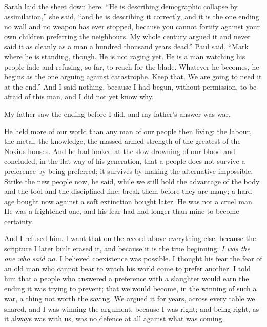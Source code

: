 \ornament

Sarah laid the sheet down here. ``He is describing demographic collapse by assimilation,'' she said, ``and he is describing it correctly, and it is the one ending no wall and no weapon has ever stopped, because you cannot fortify against your own children preferring the neighbours. My whole century argued it and never said it as cleanly as a man a hundred thousand years dead.'' Paul said, ``Mark where he is standing, though. He is not raging yet. He is a man watching his people fade and refusing, so far, to reach for the blade. Whatever he becomes, he begins as the one arguing against catastrophe. Keep that. We are going to need it at the end.'' And I said nothing, because I had begun, without permission, to be afraid of this man, and I did not yet know why.\par

\ornament

My father saw the ending before I did, and my father's answer was war.\par

He held more of our world than any man of our people then living: the labour, the metal, the knowledge, the massed armed strength of the greatest of the Noxius houses. And he had looked at the slow drowning of our blood and concluded, in the flat way of his generation, that a people does not survive a preference by being preferred; it survives by making the alternative impossible. Strike the new people now, he said, while we still hold the advantage of the body and the tool and the disciplined line; break them before they are many; a hard age bought now against a soft extinction bought later. He was not a cruel man. He was a frightened one, and his fear had had longer than mine to become certainty.\par

And I refused him. I want that on the record above everything else, because the scripture I later built erased it, and because it is the true beginning: \emph{I was the one who said no.} I believed coexistence was possible. I thought his fear the fear of an old man who cannot bear to watch his world come to prefer another. I told him that a people who answered a preference with a slaughter would earn the ending it was trying to prevent; that we would become, in the winning of such a war, a thing not worth the saving. We argued it for years, across every table we shared, and I was winning the argument, because I was right; and being right, as it always was with us, was no defence at all against what was coming.\par

